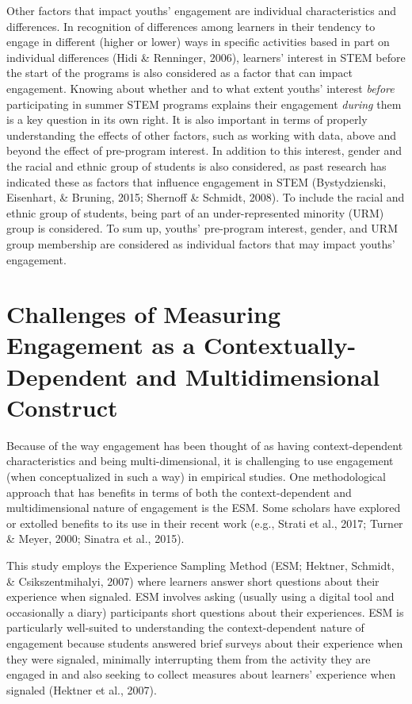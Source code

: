 \documentclass[]{msu-thesis}
\theoremstyle{definition}
\theoremstyle{definition}
\theoremstyle{definition}
\theoremstyle{remark}
\begin{document}
Other factors that impact youths' engagement are individual
characteristics and differences. In recognition of differences among
learners in their tendency to engage in different (higher or lower) ways
in specific activities based in part on individual differences (Hidi \&
Renninger, 2006), learners' interest in STEM before the start of the
programs is also considered as a factor that can impact engagement.
Knowing about whether and to what extent youths' interest \emph{before}
participating in summer STEM programs explains their engagement
\emph{during} them is a key question in its own right. It is also
important in terms of properly understanding the effects of other
factors, such as working with data, above and beyond the effect of
pre-program interest. In addition to this interest, gender and the
racial and ethnic group of students is also considered, as past research
has indicated these as factors that influence engagement in STEM
(Bystydzienski, Eisenhart, \& Bruning, 2015; Shernoff \& Schmidt, 2008).
To include the racial and ethnic group of students, being part of an
under-represented minority (URM) group is considered. To sum up, youths'
pre-program interest, gender, and URM group membership are considered as
individual factors that may impact youths' engagement.

\section{Challenges of Measuring Engagement as a Contextually-Dependent
and Multidimensional
Construct}\label{challenges-of-measuring-engagement-as-a-contextually-dependent-and-multidimensional-construct}

Because of the way engagement has been thought of as having
context-dependent characteristics and being multi-dimensional, it is
challenging to use engagement (when conceptualized in such a way) in
empirical studies. One methodological approach that has benefits in
terms of both the context-dependent and multidimensional nature of
engagement is the ESM. Some scholars have explored or extolled benefits
to its use in their recent work (e.g., Strati et al., 2017; Turner \&
Meyer, 2000; Sinatra et al., 2015).

This study employs the Experience Sampling Method (ESM; Hektner,
Schmidt, \& Csikszentmihalyi, 2007) where learners answer short
questions about their experience when signaled. ESM involves asking
(usually using a digital tool and occasionally a diary) participants
short questions about their experiences. ESM is particularly well-suited
to understanding the context-dependent nature of engagement because
students answered brief surveys about their experience when they were
signaled, minimally interrupting them from the activity they are engaged
in and also seeking to collect measures about learners' experience when
signaled (Hektner et al., 2007).
\end{document}
